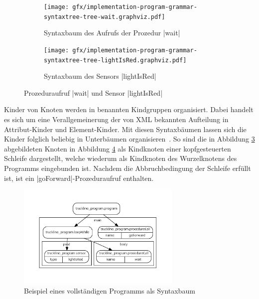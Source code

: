 \begin{figure}[h]
  \begin{subfigure}[b]{0.45\textwidth}
    \texttt{[image: gfx/implementation-program-grammar-syntaxtree-tree-wait.graphviz.pdf]}
    \caption{Syntaxbaum des Aufrufs der Prozedur \inlinec|wait|}
    \label{fig:implementation:datastructure:syntaxtree:1:wait}
  \end{subfigure}\hfill
  \begin{subfigure}[b]{0.45\textwidth}
    \texttt{[image: gfx/implementation-program-grammar-syntaxtree-tree-lightIsRed.graphviz.pdf]}
    \caption{Syntaxbaum des Sensors \inlinec|lightIsRed|}
    \label{fig:implementation:datastructure:syntaxtree:1:lightIsRed}
  \end{subfigure}\hfill
  \caption{Prozeduraufruf \inlinec|wait| und Sensor \inlinec|lightIsRed|}
  \label{fig:implementation:datastructure:syntaxtree:1}
\end{figure}

Kinder von Knoten werden in benannten Kindgruppen organisiert. Dabei handelt es sich um eine Verallgemeinerung der von XML bekannten Aufteilung in Attribut-Kinder und Element-Kinder. Mit diesen Syntaxbäumen lassen sich die Kinder folglich beliebig in Unterbäumen organisieren~\cite[4]{riemer2018}. So sind die in Abbildung \ref{fig:implementation:datastructure:syntaxtree:1} abgebildeten Knoten in Abbildung \ref{fig:implementation:datastructure:syntaxtree:2} als Kindknoten einer kopfgesteuerten Schleife dargestellt, welche wiederum als Kindknoten des Wurzelknotens des Programms eingebunden ist. Nachdem die Abbruchbedingung der Schleife erfüllt ist, ist ein \inlinec|goForward|-Prozeduraufruf enthalten.

\begin{figure}[h]
  \centering
  \includegraphics[width=0.7\textwidth]{gfx/implementation-program-grammar-syntaxtree-tree-program.graphviz.pdf}
  \caption{Beispiel eines vollständigen Programms als Syntaxbaum}
  \label{fig:implementation:datastructure:syntaxtree:2}
\end{figure}

